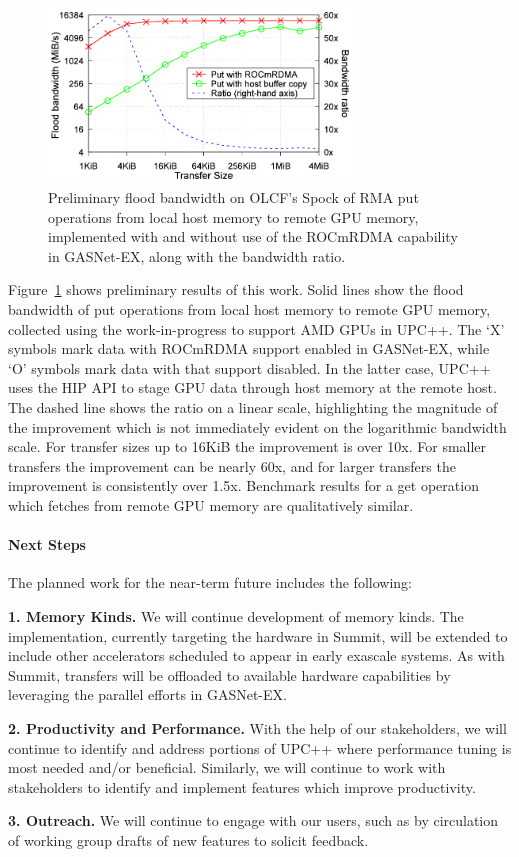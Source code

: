 \begin{figure}[htb]
  \centering
  \captionsetup{width=0.85\linewidth}
  \includegraphics[width=0.72\textwidth]{projects/2.3.1-PMR/2.3.1.14-UPCxx-GASNet/upcxx-spock.pdf}
  \caption{Preliminary flood bandwidth on OLCF's Spock of RMA put operations from
           local host memory to remote GPU memory, implemented with and without
           use of the ROCmRDMA capability in GASNet-EX, along with the bandwidth ratio.}
  \label{fig:upcxx-spock}
\end{figure}

Figure~\ref{fig:upcxx-spock} shows preliminary results of this work.  Solid
lines show the flood bandwidth of put operations from local host memory to
remote GPU memory, collected using the work-in-progress to support AMD GPUs in
UPC++.  The `X' symbols mark data with ROCmRDMA support enabled in GASNet-EX,
while `O' symbols mark data with that support disabled.  In the latter case,
UPC++ uses the HIP API to stage GPU data through host memory at the remote
host.  The dashed line shows the ratio on
a linear scale, highlighting the magnitude of the improvement which is not
immediately evident on the logarithmic bandwidth scale.  For transfer
sizes up to 16KiB the improvement is over 10x.  For smaller transfers the
improvement can be nearly 60x, and for larger transfers the improvement is consistently over
1.5x.  Benchmark results for a get operation which fetches from remote GPU
memory are qualitatively similar.

\paragraph{Next Steps}

The planned work for the near-term future includes the following:

\textbf{1. Memory Kinds.}
We will continue development of memory kinds.  The
implementation, currently targeting the hardware in Summit, will be extended to
include other accelerators scheduled to appear in early exascale systems.
As with Summit, transfers will be offloaded to available hardware capabilities
by leveraging the parallel efforts in GASNet-EX.

\textbf{2. Productivity and Performance.}
With the help of our stakeholders, we will continue to identify and address
portions of UPC++ where performance tuning is most needed
and/or beneficial.  Similarly, we will continue to work with stakeholders to
identify and implement features which improve productivity.

\textbf{3. Outreach.}
We will continue to engage with our users, such as by circulation of working
group drafts of new features to solicit feedback.

